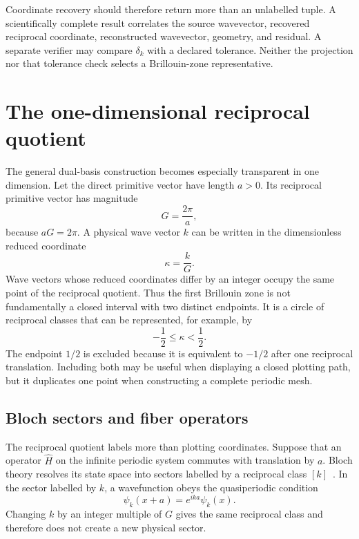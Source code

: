 Coordinate recovery should therefore return more than an unlabelled tuple. A
scientifically complete result correlates the source wavevector, recovered
reciprocal coordinate, reconstructed wavevector, geometry, and residual. A
separate verifier may compare $\delta_k$ with a declared tolerance. Neither the
projection nor that tolerance check selects a Brillouin-zone representative.

\section{The one-dimensional reciprocal quotient}

The general dual-basis construction becomes especially transparent in one
dimension. Let the direct primitive vector have length $a>0$. Its reciprocal
primitive vector has magnitude
\begin{equation}
  G=\frac{2\pi}{a},
  \label{eq:training-geometry-one-dimensional-reciprocal}
\end{equation}
because $aG=2\pi$. A physical wave vector $k$ can be written in the
dimensionless reduced coordinate
\begin{equation}
  \kappa=\frac{k}{G}.
  \label{eq:training-geometry-reduced-momentum}
\end{equation}
Wave vectors whose reduced coordinates differ by an integer occupy the same
point of the reciprocal quotient. Thus the first Brillouin zone is not
fundamentally a closed interval with two distinct endpoints. It is a circle of
reciprocal classes that can be represented, for example, by
\begin{equation}
  -\frac12\leq\kappa<\frac12.
  \label{eq:training-geometry-first-brillouin-zone}
\end{equation}
The endpoint $1/2$ is excluded because it is equivalent to $-1/2$ after one
reciprocal translation. Including both may be useful when displaying a closed
plotting path, but it duplicates one point when constructing a complete
periodic mesh.

\subsection{Bloch sectors and fiber operators}

The reciprocal quotient labels more than plotting coordinates. Suppose that
an operator $\widehat H$ on the infinite periodic system commutes with
translation by $a$. Bloch theory resolves its state space into sectors labelled
by a reciprocal class $[k]$~\cite{kittel2004,simon2013}. In the sector
labelled by $k$, a wavefunction
obeys the quasiperiodic condition
\begin{equation}
  \psi_k(x+a)=e^{ika}\psi_k(x).
  \label{eq:training-geometry-bloch-condition}
\end{equation}
Changing $k$ by an integer multiple of $G$ gives the same reciprocal class and
therefore does not create a new physical sector.

